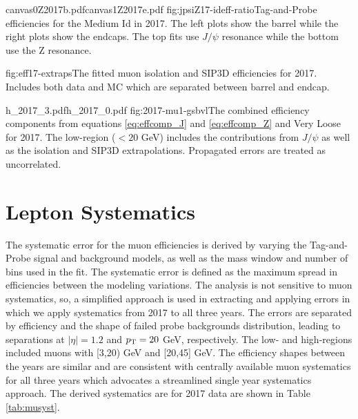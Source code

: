 %
           {canvas0Z2017b.pdf}{canvas1Z2017e.pdf}%
          {fig:jpsiZ17-ideff-ratio}{Tag-and-Probe efficiencies for the Medium Id in 2017. The left plots show the barrel while the right plots show the endcaps. The top fits use $J/\psi$ resonance while the bottom use the Z resonance. }

%
          {fig:eff17-extraps}{The fitted muon isolation and SIP3D efficiencies for 2017. Includes both data and MC which are separated between barrel and endcap.  }



		   {h_2017_3.pdf}{h_2017_0.pdf}
		   {fig:2017-mu1-gsbvl}{The combined efficiency components from equations \ref{eq:effcomp_J} and \ref{eq:effcomp_Z} and Very Loose for 2017. The low-\pt region ($<20$ GeV) includes the contributions from $J/\psi$ as well as the isolation and SIP3D extrapolations. Propagated errors are treated as uncorrelated.}


\section{Lepton Systematics}

The systematic error for the muon efficiencies is derived by varying the Tag-and-Probe signal and background models, as well as the mass window and number of bins used in the fit. The systematic error is defined as the maximum spread in efficiencies between the modeling variations. The analysis is not sensitive to muon systematics, so, a simplified approach is used in extracting and applying errors in which we apply systematics from 2017 to all three years. The errors are separated by efficiency and the shape of failed probe backgrounds distribution, leading to separations at $|\eta|=1.2$ and $p_{\mathrm{T}}=20$ GeV, respectively. The low- and high-\pt regions included muons with [3,20) GeV and [20,45] GeV. The efficiency shapes between the years are similar and are consistent with centrally available muon systematics for all three years which advocates a streamlined single year systematics approach. The derived systematics are for 2017 data are shown in Table \ref{tab:musyst}.
